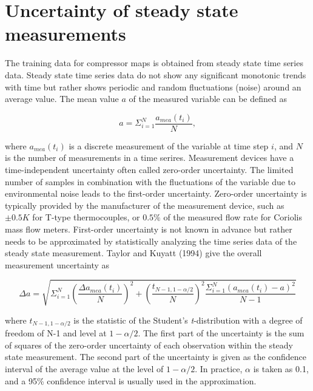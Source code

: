\section{Uncertainty of steady state measurements}
\label{sec:unc_steady}
The training data for compressor maps is obtained from steady state time series data. Steady state time series data do not show any significant monotonic trends with time but rather shows periodic and random fluctuations (noise) around an average value. The mean value $a$ of the measured variable can be defined as

\begin{equation}
a = \Sigma _{i = 1}^N{\frac{{{a_{mea}}({t_i})}}{N}},
\label{eq:avg_mea}
\end{equation}

where $a_{mea}(t_i)$ is a discrete measurement of the variable at time step $i$, and $N$ is the number of measurements in a time serires. Measurement devices have a time-independent uncertainty often called zero-order uncertainty. The limited number of samples in combination with the fluctuations of the variable due to environmental noise leads to the first-order uncertainty.  Zero-order uncertainty is typically provided by the manufacturer of the measurement device, such as $\pm0.5K$ for T-type thermocouples, or $0.5\%$ of the measured flow rate for Coriolis mass flow meters. First-order uncertainty is not known in advance but rather needs to be approximated by statistically analyzing the time series data of the steady state measurement. Taylor and Kuyatt (1994)\cite{Kamei:1995} give the overall measurement uncertainty as

\begin{equation}
\Delta a = \sqrt {\Sigma _{i = 1}^N{{\left(\frac{{\Delta {a_{mea}}({t_i})}}{N}\right)}^2} + {{\left(\frac{{{t_{N - 1,1 - \alpha /2}}}}{N}\right)}^2}\frac{{\Sigma _{i = 1}^N{{\left({a_{mea}}({t_i}) - a\right)}^2}}}{{N - 1}}} 
\label{eq:mea_unc_TK}
\end{equation}

where $t_{N-1,1-\alpha/2}$ is the statistic of the Student's \emph{t}-distribution with a degree of freedom of N-1 and level at $1-\alpha/2$. The first part of the uncertainty is the sum of squares of the zero-order uncertainty of each observation within the steady state measurement. The second part of the uncertainty is given as the confidence interval of the average value at the level of $1-\alpha/2$. In practice, $\alpha$ is taken as 0.1, and a 95\% confidence interval is usually used in the approximation.